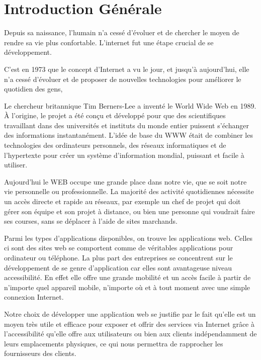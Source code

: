 \documentclass[french]{report}
\begin{document}

\tableofcontents
\listoffigures
\listoftables


\chapter*{Introduction Générale}
Depuis sa naissance, l’humain n’a cessé d’évoluer et de chercher le moyen de rendre sa vie plus confortable.
L’internet fut une étape crucial de se développement.

C’est en 1973 que le concept d’Internet a vu le jour, et jusqu’à aujourd’hui, elle n’a cessé d’évoluer
et de proposer de nouvelles technologies pour améliorer le quotidien des gens,

Le chercheur britannique Tim Berners-Lee a inventé le World Wide Web en 1989. À l’origine, le projet a 
été conçu et développé pour que des scientifiques travaillant dans des universités et instituts du monde
entier puissent s'échanger des informations instantanément. L'idée de base du WWW était de combiner les 
technologies des ordinateurs personnels, des réseaux informatiques et de l'hypertexte pour créer un système
d'information mondial, puissant et facile à utiliser.
		

Aujourd’hui le WEB occupe une grande place dans notre vie, que se soit notre vie personnelle ou professionnelle.
La majorité des activité quotidiennes nécessite un accès directe et rapide au réseaux, par exemple un chef de projet
qui doit gérer son équipe et son projet à distance, ou bien une personne qui voudrait faire ses courses, 
sans se déplacer à l’aide de sites marchands.

Parmi les types d’applications disponibles, on trouve les applications web. Celles ci sont des sites web se comportent
comme de véritables applications pour ordinateur ou téléphone. La plus part des entreprises se concentrent 
sur le développement de se genre d’application car elles sont avantageuse niveau accessibilité.
En effet elle offre une grande mobilité et un accès facile à partir de n’importe quel appareil mobile,
n’importe où et à tout moment avec une simple connexion Internet.

Notre choix de développer une application web se justifie par le fait qu'elle est un moyen très utile
et efficace pour exposer et offrir des services via Internet grâce à l'accessibilité qu'elle offre
aux utilisateurs ou bien aux clients indépendamment de leurs emplacements physiques, ce qui nous 
permettra de rapprocher les fournisseurs des clients.
\end{document}
